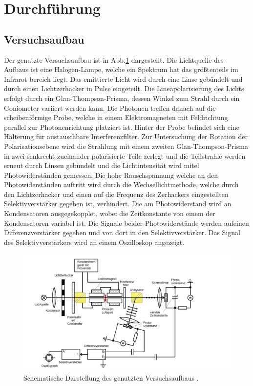 \section{Durchführung}
\subsection{Versuchsaufbau}
Der genutzte Versuchsaufbau ist in Abb.\ref{Aufbau} dargestellt. Die Lichtquelle des Aufbaus ist eine Halogen-Lampe, welche ein Spektrum hat das größtenteils im Infrarot bereich liegt. Das emittierte Licht wird durch eine Linse gebündelt und durch einen Lichtzerhacker in Pulse eingeteilt.
Die Lineapolarisierung des Lichts erfolgt durch ein Glan-Thompson-Prisma, dessen Winkel zum Strahl durch ein Goniometer variiert werden kann. Die Photonen treffen danach auf die scheibenförmige Probe, welche in einem Elektromagneten mit Feldrichtung parallel zur Photonenrichtung platziert ist. Hinter der Probe befindet sich eine Halterung für austauschbare Interferenzfilter. Zur Untersuchung der Rotation der Polarisationsebene wird die Strahlung mit einem zweiten Glan-Thompson-Prisma in zwei senkrecht zueinander polarisierte Teile  zerlegt und die Teilstrahle werden erneut durch Linsen gebündelt und die Lichtintensität wird mitel Photowiderständen gemessen. Die hohe Rauschspannung welche an den Photowiderständen auftritt wird durch die Wechsellichtmethode, welche durch den Lichtzerhacker und einen auf die Frequenz des Zerhackers eingestellten Selektivverstärker gegeben ist, verhindert. Die am Photowiderstand wird an Kondensatoren ausgegekopplet, wobei die Zeitkonstante von einem der Kondensatoren variabel ist. Die Signale beider Photowiderstände werden aufeinen Differenzverstärker gegeben und von dort in den Selektivverstärker. Das Signal des Selektivverstärkers wird an einem Oszilloskop angezeigt.
\begin{figure}[H]
  \centering
  \includegraphics[width=1\textwidth]{bilder/aufbau.png}
  \caption{Schematische Darstellung des genutzten Versuchsaufbaus \cite{anleitung}.}
  \label{Aufbau}
\end{figure}
